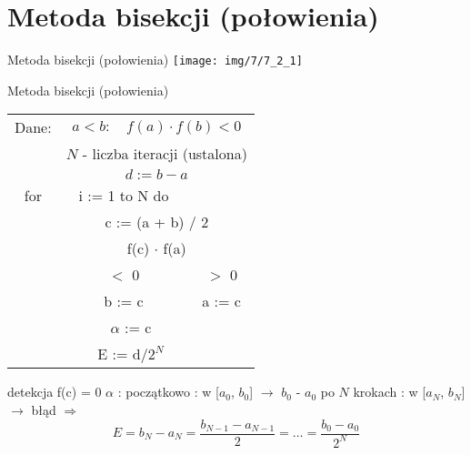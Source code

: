 \section{Metoda bisekcji (połowienia)}
\begin{frame}{Metoda bisekcji (połowienia)}
	\centering \texttt{[image: img/7/7\_2\_1]}
\end{frame}
\begin{frame}{Metoda bisekcji (połowienia)}
	\begin{table}[htbp]
		\begin{tabular}{|c|c|c|}
			\hline
			\multicolumn{1}{|c}{Dane:} & \multicolumn{2}{c|}{$a < b : \quad f(a) \cdot f(b) < 0$}\\
			\multicolumn{1}{|c}{} & \multicolumn{2}{c|}{$N$ - liczba iteracji (ustalona)}\\
			\multicolumn{1}{|c}{} & \multicolumn{2}{c|}{$d := b - a$}\\
			
			\hline
			
			\multicolumn{1}{|c}{\quad for} & \multicolumn{1}{c}{i := 1 to N do} & \text{}\\
			\cline{2-3}
			\multicolumn{1}{|c}{} & \multicolumn{2}{|c|}{c := (a + b) / 2}\\
			\cline{2-3}
			\multicolumn{1}{|c}{} & \multicolumn{2}{|c|}{f(c) $\cdot$ f(a)}\\
			\cline{2-3}
			\multicolumn{1}{|c|}{} & $<$ 0 & $>$ 0\\
			\multicolumn{1}{|c|}{} & b := c & a := c\\
			
			\hline
			
			\multicolumn{3}{|c|}{$\alpha$ := c}\\
			\multicolumn{3}{|c|}{E := d/$2^N$}\\
			\hline
		\end{tabular}
		\label{tab:transcap}
	\end{table}

	detekcja f(c) = 0\linebreak
	$\alpha$ : początkowo : w [$a_{0}$, $b_{0}$] $\rightarrow$ $b_{0}$ - $a_{0}$\linebreak
	\phantom{x} \hspace{0.2cm} po $N$ krokach : w [$a_{N}$, $b_{N}$] $\rightarrow$ błąd $\Rightarrow$
	\[
		E = b_{N} - a_{N} = \frac{b_{N-1} - a_{N-1}}{2} = \ldots = \frac{b_{0} - a_{0}}{2^{N}}
	\]
\end{frame}
